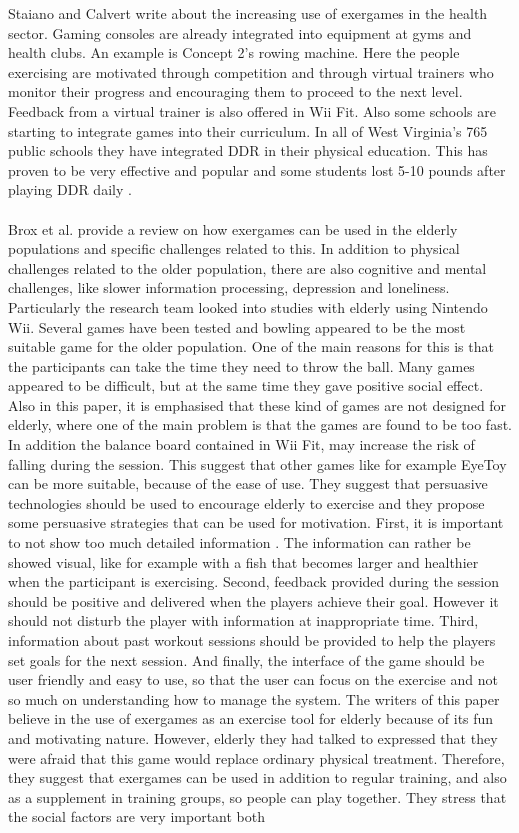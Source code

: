 Staiano and Calvert write about the increasing use of exergames in the health sector. Gaming consoles are already integrated into equipment at gyms and health clubs. An example is Concept 2’s rowing machine. Here the people exercising are motivated through competition and through virtual trainers who monitor their progress and encouraging them to proceed to the next level. Feedback from a virtual trainer is also offered in Wii Fit. Also some schools are starting to integrate games into their curriculum. In all of West Virginia’s 765 public schools they have integrated DDR in their physical education. This has proven to be very effective and popular and some students lost 5-10 pounds after playing DDR daily \cite{staiano2011exergames}. \\ \\
Brox et al. \cite{exergamesforelderly} provide a review on how exergames can be used in the elderly populations and specific challenges related to this. In addition to physical challenges related to the older population, there are also cognitive and  mental challenges, like slower information processing, depression and loneliness. Particularly the research team  looked into studies with elderly using Nintendo Wii. Several games have been tested and bowling appeared to be the most suitable game for the older population. One of the main reasons for this is that the participants can take the time they need to throw the ball. Many games appeared to be difficult, but at the same time they gave positive social effect. Also in this paper, it is emphasised that these kind of games are not designed for elderly, where one of the main problem is that the games are found to be too fast. In addition the balance board contained in Wii Fit, may increase the risk of falling during the session. This suggest that other games like  for example EyeToy can  be more suitable, because of the ease of use. They suggest that persuasive technologies should be used to encourage elderly to exercise and they propose some persuasive strategies that can be used for motivation. First, it is important to not show too much  detailed information . The information can rather be showed visual, like for example with a fish that becomes larger and healthier when the participant is exercising. Second, feedback provided during the session should be positive and delivered when the players achieve their goal. However it should not disturb the player with information at inappropriate time. Third, information about past workout sessions should be  provided to help the players set goals for the next session. And finally, the interface of the game should be user friendly and easy to use, so that the user can focus on the exercise and not so much on understanding how to manage the system.  The writers of this paper believe in the use of  exergames as an exercise tool for elderly because of its fun and motivating nature. However, elderly they had talked to expressed that they were afraid that this game would replace ordinary physical treatment. Therefore, they suggest that exergames can be used in addition to regular training, and also as a supplement in training groups, so people can play together. They stress that the social factors are very important  both 